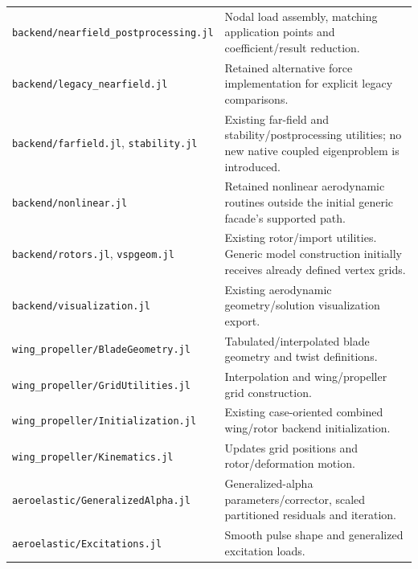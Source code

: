 \documentclass[11pt,a4paper]{article}
\newcommand{\code}{\nolinkurl}
\begin{document}
\begin{longtable}{@{}L{.36\linewidth}L{.56\linewidth}@{}}
\code{backend/nearfield_postprocessing.jl} & Nodal load assembly, matching application points and coefficient/result reduction.\\
\code{backend/legacy_nearfield.jl} & Retained alternative force implementation for explicit legacy comparisons.\\
\code{backend/farfield.jl}, \code{stability.jl} & Existing far-field and stability/postprocessing utilities; no new native coupled eigenproblem is introduced.\\
\code{backend/nonlinear.jl} & Retained nonlinear aerodynamic routines outside the initial generic facade's supported path.\\
\code{backend/rotors.jl}, \code{vspgeom.jl} & Existing rotor/import utilities. Generic model construction initially receives already defined vertex grids.\\
\code{backend/visualization.jl} & Existing aerodynamic geometry/solution visualization export.\\
\code{wing_propeller/BladeGeometry.jl} & Tabulated/interpolated blade geometry and twist definitions.\\
\code{wing_propeller/GridUtilities.jl} & Interpolation and wing/propeller grid construction.\\
\code{wing_propeller/Initialization.jl} & Existing case-oriented combined wing/rotor backend initialization.\\
\code{wing_propeller/Kinematics.jl} & Updates grid positions and rotor/deformation motion.\\
\code{aeroelastic/GeneralizedAlpha.jl} & Generalized-alpha parameters/corrector, scaled partitioned residuals and iteration.\\
\code{aeroelastic/Excitations.jl} & Smooth pulse shape and generalized excitation loads.\\
\bottomrule
\end{longtable}
\end{document}
